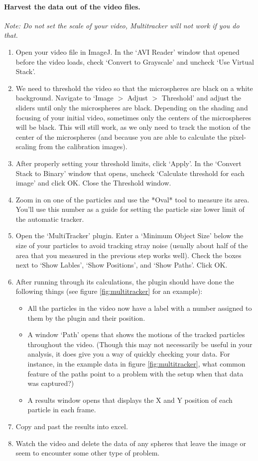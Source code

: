 \paragraph*{Harvest the data out of the video files.}
\emph{Note: Do not set the scale of your video, Multitracker will not work if you do that.}
\begin{enumerate}
\item Open your video file in ImageJ. In the `AVI Reader' window that opened before the video loads, check `Convert to Grayscale' and uncheck `Use Virtual Stack'.
\item We need to threshold the video so that the microspheres are black on a white background. Navigate to `Image $>$ Adjust $>$ Threshold' and adjust the sliders until only the microspheres are black. Depending on the shading and focusing of your initial video, sometimes only the centers of the microspheres will be black. This will still work, as we only need to track the motion of the center of the microspheres (and because you are able to calculate the pixel-scaling from the calibration images).
\item After properly setting your threshold limits, click `Apply'. In the `Convert Stack to Binary' window that opens, uncheck `Calculate threshold for each image' and click OK. Close the Threshold window.
\item Zoom in on one of the particles and use the *Oval* tool to measure its area. You'll use this number as a guide for setting the particle size lower limit of the automatic tracker.
\item Open the `MultiTracker' plugin. Enter a `Minimum Object Size' below the size of your particles to avoid tracking stray noise (usually about half of the area that you measured in the previous step works well). Check the boxes next to `Show Lables', `Show Positions', and `Show Paths'. Click OK.
\item After running through its calculations, the plugin should have done the following things (see figure \ref{fig:multitracker} for an example):
\begin{itemize}
	\item All the particles in the video now have a label with a number assigned to them by the plugin and their position.
	\item A window `Path' opens that shows the motions of the tracked particles throughout the video. (Though this may not necessarily be useful in your analysis, it does give you a way of quickly checking your data. For instance, in the example data in figure \ref{fig:multitracker}, what common feature of the paths point to a problem with the setup when that data was captured?)
	\item A results window opens that displays the X and Y position of each particle in each frame.
\end{itemize}
\item Copy and past the results into excel.
\item Watch the video and delete the data of any spheres that leave the image or seem to encounter some other type of problem.
\end{enumerate}
